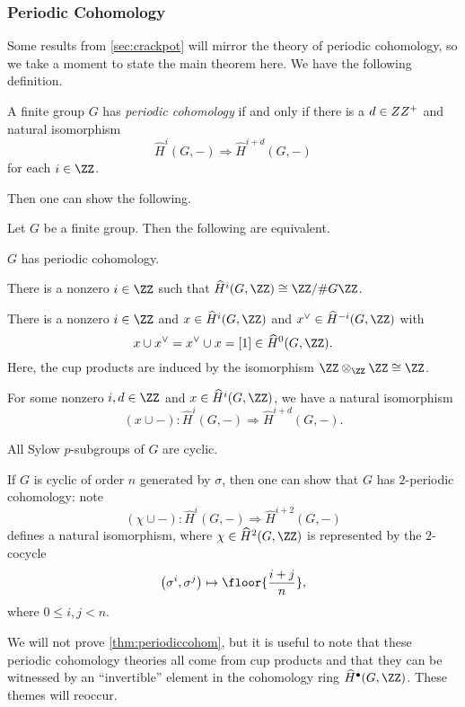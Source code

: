 \subsubsection{Periodic Cohomology}
Some results from \autoref{sec:crackpot} will mirror the theory of periodic cohomology, so we take a moment to state the main theorem here. We have the following definition.
\begin{definition}
	A finite group $G$ has \textit{periodic cohomology} if and only if there is a $d\in\\ZZ^+$ and natural isomorphism
	\[\widehat H^i(G,-)\Rightarrow\widehat H^{i+d}(G,-)\]
	for each $i\in\ZZ$.
\end{definition}
Then one can show the following.
\begin{theorem} \label{thm:periodiccohom}
	Let $G$ be a finite group. Then the following are equivalent.
	\begin{listalph}
		\item $G$ has periodic cohomology.
		\item There is a nonzero $i\in\ZZ$ such that $\widehat H^i(G,\ZZ)\cong\ZZ/\#G\ZZ$.
		\item There is a nonzero $i\in\ZZ$ and $x\in\widehat H^i(G,\ZZ)$ and $x^\lor\in\widehat H^{-i}(G,\ZZ)$ with
		\[x\cup x^\lor=x^\lor\cup x=[1]\in\widehat H^0(G,\ZZ).\]
		Here, the cup products are induced by the isomorphism $\ZZ\otimes_\ZZ\ZZ\cong\ZZ$.
		\item For some nonzero $i,d\in\ZZ$ and $x\in\widehat H^i(G,\ZZ)$, we have a natural isomorphism
		\[(x\cup-)\colon\widehat H^i(G,-)\Rightarrow\widehat H^{i+d}(G,-).\]
		\item All Sylow $p$-subgroups of $G$ are cyclic.
	\end{listalph}
\end{theorem}
\begin{example}
	If $G$ is cyclic of order $n$ generated by $\sigma$, then one can show that $G$ has $2$-periodic cohomology: note
	\[(\chi\cup-)\colon\widehat H^i(G,-)\Rightarrow\widehat H^{i+2}(G,-)\]
	defines a natural isomorphism, where $\chi\in\widehat H^2(G,\ZZ)$ is represented by the $2$-cocycle
	\[\left(\sigma^i,\sigma^j\right)\mapsto\floor{\frac{i+j}n},\]
	where $0\le i,j<n$.
\end{example}
We will not prove \autoref{thm:periodiccohom}, but it is useful to note that these periodic cohomology theories all come from cup products and that they can be witnessed by an ``invertible'' element in the cohomology ring $\widehat H^\bullet(G,\ZZ)$. These themes will reoccur.

